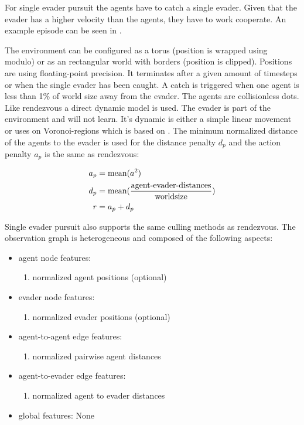 For single evader pursuit the agents have to catch a single evader. Given that the evader has a higher velocity than the agents, they have to work cooperate. An example episode can be seen in .\par

The environment can be configured as a torus (position is wrapped using modulo) or as an rectangular world with borders (position is clipped). Positions are using floating-point precision. It terminates after a given amount of timesteps or when the single evader has been caught. A catch is triggered when one agent is less than 1\% of world size away from the evader.
The agents are collisionless dots. Like rendezvous a direct dynamic model is used. The evader is part of the environment and will not learn. It's dynamic is either a simple linear movement or uses on Voronoi-regions which is based on \citet{ZHOU201664}.
The minimum normalized distance of the agents to the evader is used for the distance penalty $d_p$ and the action penalty $a_p$ is the same as rendezvous:

\begin{equation}
    \begin{aligned}
        a_p &= \textup{mean}(a^2)\\
        d_p &= \textup{mean}(\frac{\textup{agent-evader-distances}}{\textup{worldsize}}) \\
        r &= a_p + d_p
    \end{aligned}
    \nonumber
\end{equation}

Single evader pursuit also supports the same culling methods as rendezvous. The observation graph is heterogeneous and composed of the following aspects:
\begin{itemize}[noitemsep,nolistsep]
    \item agent node features:
    \begin{enumerate}
        \item normalized agent positions (optional)
    \end{enumerate} 
    \item evader node features:
    \begin{enumerate}
        \item normalized evader positions (optional)
    \end{enumerate}
    \item agent-to-agent edge features:
    \begin{enumerate}
        \item normalized pairwise agent distances
    \end{enumerate} 
    \item agent-to-evader edge features:
    \begin{enumerate}
        \item normalized agent to evader distances
    \end{enumerate} 
    \item global features: None
\end{itemize}



